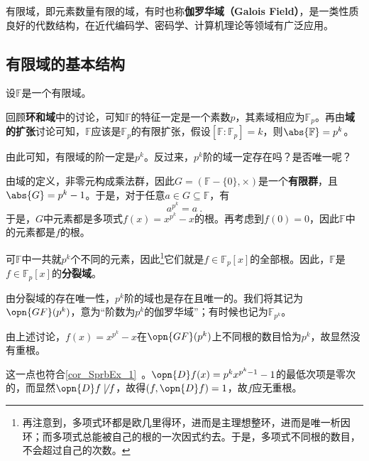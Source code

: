 


有限域，即元素数量有限的域，有时也称\textbf{伽罗华域（Galois Field）}，是一类性质良好的代数结构，在近代编码学、密码学、计算机理论等领域有广泛应用。

\subsection{有限域的基本结构}

设$\mathbb{F}$是一个有限域。

回顾\textbf{环和域}中的讨论，可知$\mathbb{F}$的特征一定是一个素数$p$，其素域相应为$\mathbb{F}_p$。再由\textbf{域的扩张}讨论可知，$\mathbb{F}$应该是$\mathbb{F}_p$的有限扩张，假设$[\mathbb{F}:\mathbb{F}_p]=k$，则$\abs{\mathbb{F}}=p^k$。

由此可知，有限域的阶一定是$p^k$。反过来，$p^k$阶的域一定存在吗？是否唯一呢？

由域的定义，非零元构成乘法群，因此$G=(\mathbb{F}-\{0\}, \times)$是一个\textbf{有限群}，且$\abs{G}=p^k-1$。于是，对于任意$a\in G\subseteq\mathbb{F}$，有
\begin{equation}
a^{p^k}=a~.
\end{equation}
于是，$G$中元素都是多项式$f(x)=x^{p^k}-x$的根。再考虑到$f(0)=0$，因此$\mathbb{F}$中的元素都是$f$的根。

可$\mathbb{F}$中一共就$p^k$个不同的元素，因此\footnote{再注意到，多项式环都是欧几里得环，进而是主理想整环，进而是唯一析因环；而多项式总能被自己的根的一次因式约去。于是，多项式不同根的数目，不会超过自己的次数。}它们就是$f\in\mathbb{F}_p[x]$的全部根。因此，$\mathbb{F}$是$f\in\mathbb{F}_p[x]$的\textbf{分裂域}。

由分裂域的存在唯一性，$p^k$阶的域也是存在且唯一的。我们将其记为$\opn{GF}(p^k)$，意为“阶数为$p^k$的伽罗华域”；有时候也记为$\mathbb{F}_{p^k}$。

\begin{example}{}
由上述讨论，$f(x)=x^{p^k}-x$在$\opn{GF}(p^k)$上不同根的数目恰为$p^k$，故显然没有重根。

这一点也符合\autoref{cor_SprbEx_1}~。$\opn{D}f(x)=p^kx^{p^k-1}-1$的最低次项是零次的，而显然$\opn{D}f\not\mid f$，故得$(f, \opn{D}f)=1$，故$f$应无重根。
\end{example}


